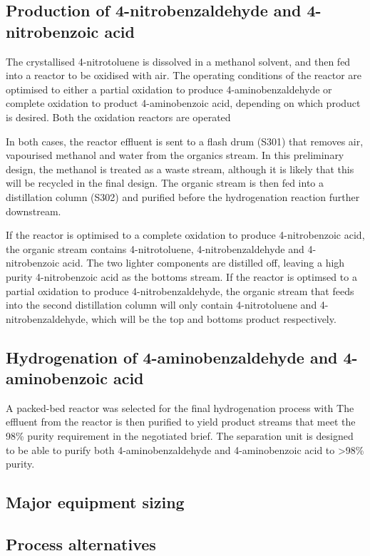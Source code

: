 \subsection{Production of 4-nitrobenzaldehyde and 4-nitrobenzoic acid}
The crystallised 4-nitrotoluene is dissolved in a methanol solvent, and then fed into a reactor to be oxidised with air. The operating conditions of the reactor are optimised to either a partial oxidation to produce 4-aminobenzaldehyde or complete oxidation to product 4-aminobenzoic acid, depending on which product is desired. Both the oxidation reactors are operated  

In both cases, the reactor effluent is sent to a flash drum (S301) that removes air, vapourised methanol and water from the organics stream. In this preliminary design, the methanol is treated as a waste stream, although it is likely that this will be recycled in the final design. The organic stream is then fed into a distillation column (S302) and purified before the hydrogenation reaction further downstream.

If the reactor is optimised to a complete oxidation to produce 4-nitrobenzoic acid, the organic stream contains 4-nitrotoluene, 4-nitrobenzaldehyde and 4-nitrobenzoic acid. The two lighter components are distilled off, leaving a high purity 4-nitrobenzoic acid as the bottoms stream. If the reactor is optimsed to a partial oxidation to produce 4-nitrobenzaldehyde, the organic stream that feeds into the second distillation column will only contain 4-nitrotoluene and 4-nitrobenzaldehyde, which will be the top and bottoms product respectively. 

\subsection{Hydrogenation of 4-aminobenzaldehyde and 4-aminobenzoic acid}

A packed-bed reactor was selected for the final hydrogenation process with 
The effluent from the reactor is then purified to yield product streams that meet the 98\% purity requirement in the negotiated brief. The separation unit is designed to be able to purify both 4-aminobenzaldehyde and 4-aminobenzoic acid to >98\% purity.

\subsection{Major equipment sizing}


\subsection{Process alternatives}


